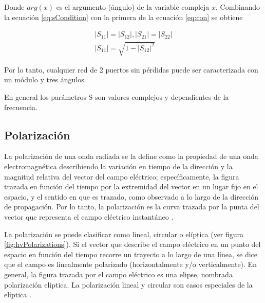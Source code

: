 \begin{itemize}
Donde $arg(x)$ es el argumento (ángulo) de la variable compleja $x$. Combinando la ecuación \ref{eq:sCondition} con la primera
de la ecuación \ref{eq:con} se obtiene

\begin{equation}
\begin{aligned}
	|S_{11}| = |S_{12}|, |S_{21}| = |S_{22}| \\
	|S_{11}| = \sqrt{1 - |S_{12}|^2}
\end{aligned}
\end{equation}

Por lo tanto, cualquier red de 2 puertos sin pérdidas puede ser caracterizada con un módulo y tres ángulos.
\end{itemize}

En general los parámetros S son valores complejos y dependientes de la frecuencia.


\subsection{Polarización}

La polarización de una onda radiada se la define como la propiedad de una onda electromagnética 
describiendo la variación en tiempo de la dirección y la magnitud relativa del vector del campo eléctrico; específicamente, 
la figura trazada en función del tiempo por la extremidad del vector en un lugar fijo en el espacio, y el sentido en que es
trazado, como observado a lo largo de la dirección de propagación. Por lo tanto, la polarización es la curva trazada por la
punta del vector que representa el campo eléctrico instantáneo \cite{Balanis2012}. 

La polarización se puede clasificar como lineal, circular o elíptica (ver figura \ref{fig:hvPolarizations}). Si el vector que 
describe el campo eléctrico en un punto del espacio en función del tiempo recorre un trayecto a lo largo de una línea, se dice
que el campo es linealmente polarizado (horizontalmente y/o verticalmente). En general, la figura trazada por el campo eléctrico 
es una elipse, nombrada polarización elíptica. La polarización lineal y circular son casos especiales de la elíptica \cite{Vita2012}.

